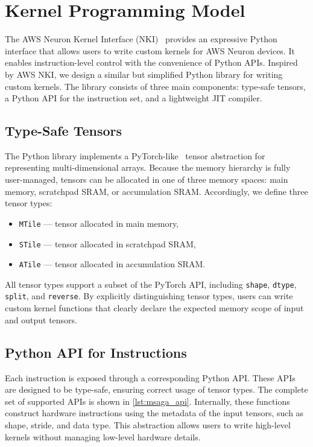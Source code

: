 \section{\MSAGA{} Kernel Programming Model}

The AWS Neuron Kernel Interface (NKI)~\cite{aws_neuron_nki} provides an expressive 
Python interface that allows users to write custom kernels for AWS Neuron 
devices. It enables instruction-level control with the convenience of 
Python APIs.
Inspired by AWS NKI, we design a similar but simplified Python library 
for writing custom \MSAGA{} kernels. The library consists of three main 
components: type-safe tensors, a Python API for the \MSAGA{} instruction set, 
and a lightweight JIT compiler.

\subsection{Type-Safe Tensors}

The \MSAGA{} Python library implements a PyTorch-like~\cite{pytorch,pytorch2} tensor abstraction 
for representing multi-dimensional arrays. Because the memory hierarchy 
is fully user-managed, tensors can be allocated in one of three memory 
spaces: main memory, scratchpad SRAM, or accumulation SRAM. Accordingly, 
we define three tensor types:

\begin{itemize}
  \item \texttt{MTile} — tensor allocated in main memory,
  \item \texttt{STile} — tensor allocated in scratchpad SRAM,
  \item \texttt{ATile} — tensor allocated in accumulation SRAM.
\end{itemize}

All tensor types support a subset of the PyTorch API, including 
\texttt{shape}, \texttt{dtype}, \texttt{split}, and \texttt{reverse}. 
By explicitly distinguishing tensor types, users can write custom 
kernel functions that clearly declare the expected memory scope of input and output 
tensors.

\subsection{Python API for \MSAGA{} Instructions}

Each \MSAGA{} instruction is exposed through a corresponding Python API. 
These APIs are designed to be type-safe, ensuring correct usage of 
tensor types. The complete set of supported APIs is shown in 
\autoref{lst:msaga_api}.
Internally, these functions construct hardware instructions using the 
metadata of the input tensors, such as shape, stride, and data type. 
This abstraction allows users to write high-level kernels without 
managing low-level hardware details.

